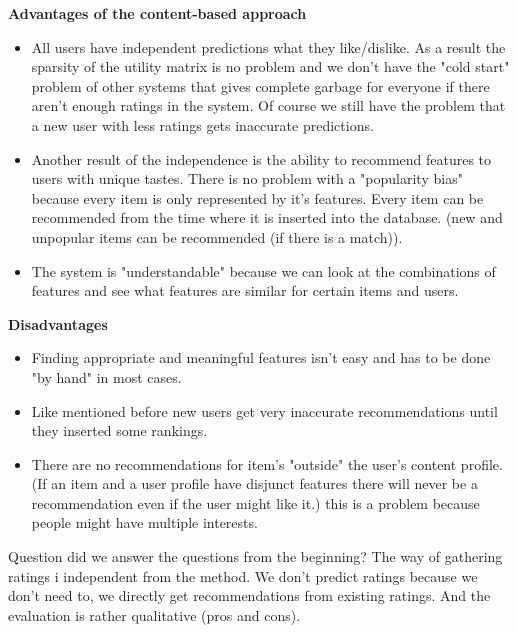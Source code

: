 \documentclass[]{article}
\begin{document}
\textbf{Advantages of the content-based approach}
\begin{itemize}
\item All users have independent predictions what they like/dislike. As a result the sparsity of the utility matrix is no problem and we don't have the "cold start" problem of other systems that gives complete garbage for everyone if there aren't enough ratings in the system. Of course we still have the problem that a new user with less ratings gets inaccurate predictions.
\item Another result of the independence is the ability to recommend features to users with unique tastes. 
There is no problem with a "popularity bias" because every item is only represented by it's features. Every item can be recommended from the time where it is inserted into the database. (new and unpopular items can be recommended (if there is a match)).
\item The system is "understandable" because we can look at the combinations of features and see what features are similar for certain items and users.
\end{itemize}
\textbf{Disadvantages}
\begin{itemize}
\item Finding appropriate and meaningful features isn't easy and has to be done "by hand" in most cases.
\item Like mentioned before new users get very inaccurate recommendations until they inserted some rankings.
\item There are no recommendations for item's "outside" the user's content profile. (If an item and a user profile have disjunct features there will never be a recommendation even if the user might like it.) this is a problem because people might have multiple interests. 
\end{itemize}
Question did we answer the questions from the beginning? The way of gathering ratings i independent from the method. We don't predict ratings because we don't need to, we directly get recommendations from existing ratings. And the evaluation is rather qualitative (pros and cons).
\end{document}

